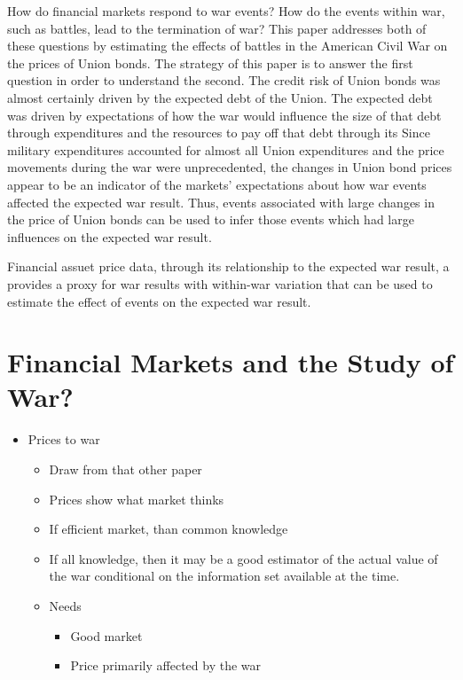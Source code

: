 How do financial markets respond to war events?
How do the events within war, such as battles, lead to the termination of war?
This paper addresses both of these questions by estimating the effects of battles in the American Civil War on the prices of Union bonds.
The strategy of this paper is to answer the first question in order to understand the second.
The credit risk of Union bonds was almost certainly driven by the expected debt of the Union.
The expected debt was driven by expectations of how the war would influence the size of that debt through expenditures and the resources to pay off that debt through its
Since military expenditures accounted for almost all Union expenditures and the price movements during the war were unprecedented, the changes in Union bond prices appear to be an indicator of the markets' expectations about how war events affected the expected war result.
Thus, events associated with large changes in the price of Union bonds can be used to infer those events which had large influences on the expected war result.

Financial assuet price data, through its relationship to the expected war result, a provides a proxy for war results with within-war variation that can be used to estimate the effect of events on the expected war result.



\section{Financial Markets and the Study of War?}
\label{bonds_battles:sec:barg-theory-war}

\begin{itemize}
\item Prices to war
  \begin{itemize}
  \item Draw from that other paper
  \item Prices show what market thinks
  \item If efficient market, than common knowledge
  \item If all knowledge, then it may be a good estimator of the actual value of the war conditional on the information set available at the time.
  \item Needs
    \begin{itemize}
    \item Good market
    \item Price primarily affected by the war
    \end{itemize}
  \end{itemize}
\end{itemize}



